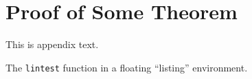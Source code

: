 \chapter{Proof of Some Theorem}
\label{app:somethms}

This is appendix text.

\begin{listing}
\caption{The \texttt{lintest} function in a floating ``listing'' environment.}
\label{mfile:linetest-3}
\end{listing}

